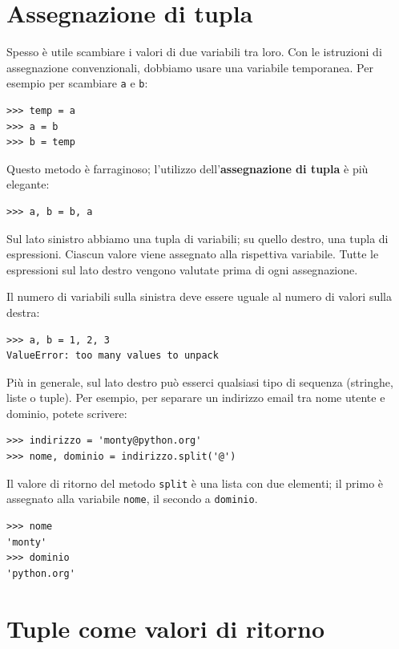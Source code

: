 \documentclass[10pt]{book}
\begin{document}
\section{Assegnazione di tupla}
\label{tuple.assignment}

Spesso è utile scambiare i valori di due variabili tra loro. Con le istruzioni di assegnazione convenzionali, dobbiamo usare una variabile temporanea. Per esempio per scambiare {\tt a} e {\tt b}:

\begin{verbatim}
>>> temp = a
>>> a = b
>>> b = temp
\end{verbatim}
%
Questo metodo è farraginoso; l'utilizzo dell'{\bf assegnazione di tupla} è più elegante:

\begin{verbatim}
>>> a, b = b, a
\end{verbatim}
%
Sul lato sinistro abbiamo una tupla di variabili; su quello destro, una tupla di espressioni. Ciascun valore viene assegnato alla rispettiva variabile. Tutte le espressioni sul lato destro vengono valutate prima di ogni assegnazione.

Il numero di variabili sulla sinistra deve essere uguale al numero di valori sulla destra:

\begin{verbatim}
>>> a, b = 1, 2, 3
ValueError: too many values to unpack
\end{verbatim}
%
Più in generale, sul lato destro può esserci qualsiasi tipo di sequenza (stringhe, liste o tuple). Per esempio, per separare un indirizzo email tra nome utente e dominio, potete scrivere:

\begin{verbatim}
>>> indirizzo = 'monty@python.org'
>>> nome, dominio = indirizzo.split('@')
\end{verbatim}
%
Il valore di ritorno del metodo {\tt split} è una lista con due elementi; il primo è assegnato alla variabile {\tt nome}, il secondo a {\tt dominio}.

\begin{verbatim}
>>> nome
'monty'
>>> dominio
'python.org'
\end{verbatim}
%

\section{Tuple come valori di ritorno}
\end{document}
